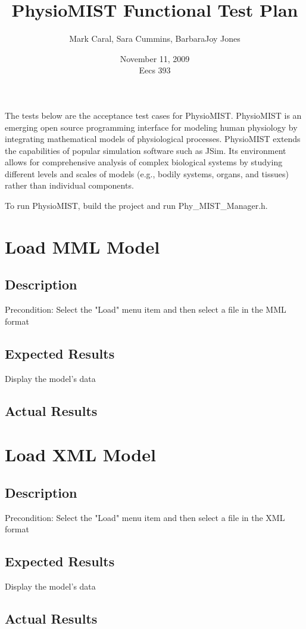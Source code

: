 \documentclass{article}
\title{PhysioMIST Functional Test Plan}
\author{Mark Caral, Sara Cummins, BarbaraJoy Jones}
\date{November 11, 2009\\{\sc Eecs} 393}
\begin{document}
\begin{titlepage}
\maketitle\thispagestyle{empty}
\end{titlepage}

The tests below are the acceptance test cases for PhysioMIST.
PhysioMIST is an emerging open source programming interface for modeling human physiology by integrating mathematical models of physiological processes.
PhysioMIST extends the capabilities of popular simulation software such as JSim.
Its environment allows for comprehensive analysis of complex biological systems by studying different levels and scales of models (e.g., bodily systems, organs, and tissues) rather than individual components.

To run PhysioMIST, build the project and run Phy\_MIST\_Manager.h.

\section{Load MML Model}
\subsection{Description}
Precondition: Select the "Load" menu item and then select a file in the MML format
\subsection{Expected Results}
Display the model's data
\subsection{Actual Results}

\section{Load XML Model}
\subsection{Description}
Precondition: Select the "Load" menu item and then select a file in the XML format
\subsection{Expected Results}
Display the model's data
\subsection{Actual Results}
\end{document}
